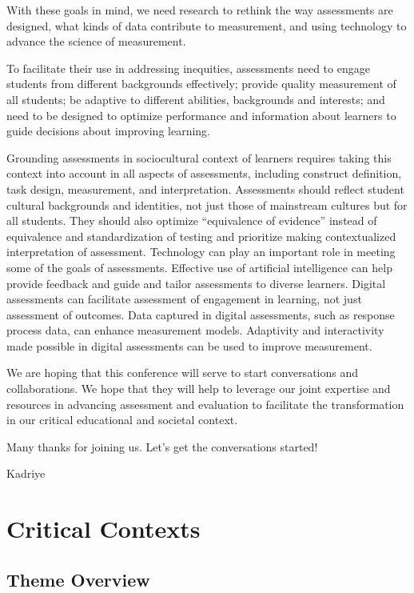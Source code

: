 \documentclass[
]{book}
\begin{document}
With these goals in mind, we need research to rethink the way assessments are designed, what kinds of data contribute to measurement, and using technology to advance the science of measurement.

To facilitate their use in addressing inequities, assessments need to engage students from different backgrounds effectively; provide quality measurement of all students; be adaptive to different abilities, backgrounds and interests; and need to be designed to optimize performance and information about learners to guide decisions about improving learning.

Grounding assessments in sociocultural context of learners requires taking this context into account in all aspects of assessments, including construct definition, task design, measurement, and interpretation. Assessments should reflect student cultural backgrounds and identities, not just those of mainstream cultures but for all students. They should also optimize ``equivalence of evidence'' instead of equivalence and standardization of testing and prioritize making contextualized interpretation of assessment.
Technology can play an important role in meeting some of the goals of assessments. Effective use of artificial intelligence can help provide feedback and guide and tailor assessments to diverse learners. Digital assessments can facilitate assessment of engagement in learning, not just assessment of outcomes. Data captured in digital assessments, such as response process data, can enhance measurement models. Adaptivity and interactivity made possible in digital assessments can be used to improve measurement.

We are hoping that this conference will serve to start conversations and collaborations. We hope that they will help to leverage our joint expertise and resources in advancing assessment and evaluation to facilitate the transformation in our critical educational and societal context.

Many thanks for joining us. Let's get the conversations started!

Kadriye

\hypertarget{theme1}{%
\chapter{Critical Contexts}\label{theme1}}

\hypertarget{theme-overview}{%
\section{Theme Overview}\label{theme-overview}}
\end{document}
